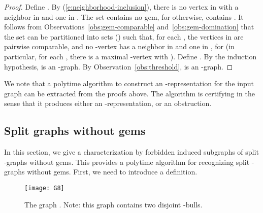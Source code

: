 \documentclass[11pt,3p,times]{elsarticle}
\newenvironment{myproof}{\begin{proof}}{\end{proof}}
\begin{document}
\begin{myproof}
Define . By (\ref{e:neighborhood-inclusion}), there
is no vertex in  with a neighbor in  and one in . The
set  contains no gem, for otherwise, 
contains .
It follows from Observations~\ref{obs:gem-comparable}
and~\ref{obs:gem-domination} that the set  can be partitioned
into sets  () such that, for each
, the vertices in  are pairwise comparable, and
no -vertex has a neighbor in  and one in , for  (in particular, for each , there is a maximal
-vertex  with ). Define . By the induction hypothesis,  is an
-graph. By Observation~\ref{obs:threshold},  is  an
-graph. 
\end{myproof}

We note that a polytime algorithm to construct an
-representation for the input graph can be extracted from
the proofs above. The algorithm is certifying in the sense that it
produces either an -representation, or an obstruction.

\subsection{Split graphs without gems}
In this section, we give a characterization by forbidden induced
subgraphs of split -graphs without gems. This provides a
polytime algorithm for recognizing split -graphs without
gems. First, we need to introduce a definition.

\begin{figure}[h]
\centering
\texttt{[image: G8]}
\caption{The graph . Note: this graph contains two disjoint -bulls.}
\label{fig:G8}
\end{figure}
\end{document}
